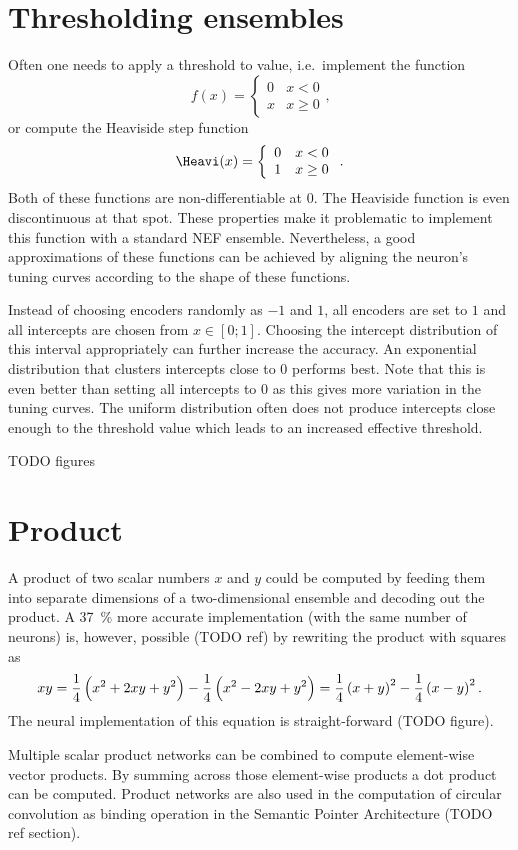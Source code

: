 \section{Thresholding ensembles}\label{sec:thresholding}
Often one needs to apply a threshold to value, i.e.\ implement the function
\begin{equation}
    f(x) = \left\{ \begin{array}{ll}
            0 & x < 0 \\
            x & x \geq 0
        \end{array} \right.
    \text{,}
\end{equation}
or compute the Heaviside step function
\begin{equation}
    \Heavi(x) = \left\{ \begin{array}{ll}
            0 & x < 0 \\
            1 & x \geq 0
        \end{array} \right.
    \text{.}
\end{equation}
Both of these functions are non-differentiable at 0.
The Heaviside function is even discontinuous at that spot.
These properties make it problematic to implement this function with a standard NEF ensemble.
Nevertheless, a good approximations of these functions can be achieved by aligning the neuron's tuning curves according to the shape of these functions.

Instead of choosing encoders randomly as $-1$ and $1$, all encoders are set to $1$ and all intercepts are chosen from $x \in [0; 1]$.
Choosing the intercept distribution of this interval appropriately can further increase the accuracy.
An exponential distribution that clusters intercepts close to 0 performs best.
Note that this is even better than setting all intercepts to 0 as this gives more variation in the tuning curves.
The uniform distribution often does not produce intercepts close enough to the threshold value which leads to an increased effective threshold.

TODO figures

\section{Product}
A product of two scalar numbers $x$ and $y$ could be computed by feeding them into separate dimensions of a two-dimensional ensemble and decoding out the product.
A \SI{37}{\percent} more accurate implementation (with the same number of neurons) is, however, possible (TODO ref) by rewriting the product with squares as
\begin{equation}
    xy = \frac{1}{4}\del{x^2 + 2xy + y^2} - \frac{1}{4}\del{x^2 - 2xy + y^2} = \frac{1}{4}\del{x + y}^2 - \frac{1}{4}\del{x - y}^2 \text{.}
\end{equation}
The neural implementation of this equation is straight-forward (TODO figure).

Multiple scalar product networks can be combined to compute element-wise vector products.
By summing across those element-wise products a dot product can be computed.
Product networks are also used in the computation of circular convolution as binding operation in the Semantic Pointer Architecture (TODO ref section).
